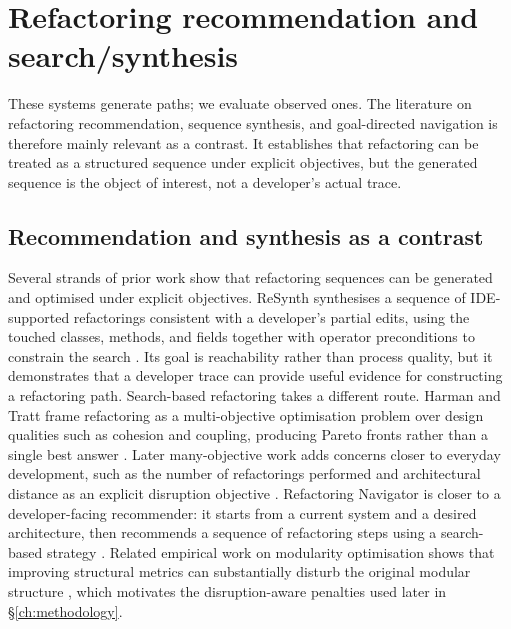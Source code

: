 \section{Refactoring recommendation and search/synthesis}
\label{sec:recommendation-synthesis}

These systems generate paths; we evaluate observed ones. The literature on refactoring recommendation, sequence synthesis, and goal-directed navigation is therefore mainly relevant as a contrast. It establishes that refactoring can be treated as a structured sequence under explicit objectives, but the generated sequence is the object of interest, not a developer's actual trace.

\subsection{Recommendation and synthesis as a contrast}
\label{sec:recommendation-contrast}

Several strands of prior work show that refactoring sequences can be generated and optimised under explicit objectives. ReSynth synthesises a sequence of IDE-supported refactorings consistent with a developer's partial edits, using the touched classes, methods, and fields together with operator preconditions to constrain the search \cite{raychev2013resynth}. Its goal is reachability rather than process quality, but it demonstrates that a developer trace can provide useful evidence for constructing a refactoring path. Search-based refactoring takes a different route. Harman and Tratt frame refactoring as a multi-objective optimisation problem over design qualities such as cohesion and coupling, producing Pareto fronts rather than a single best answer \cite{harman2007pareto}. Later many-objective work adds concerns closer to everyday development, such as the number of refactorings performed \cite{mohan2019manyobjective} and architectural distance as an explicit disruption objective \cite{cortellessa2023manyobjective}. Refactoring Navigator is closer to a developer-facing recommender: it starts from a current system and a desired architecture, then recommends a sequence of refactoring steps using a search-based strategy \cite{lin2016navigator}. Related empirical work on modularity optimisation shows that improving structural metrics can substantially disturb the original modular structure \cite{paixao2017balancing}, which motivates the disruption-aware penalties used later in \S\ref{ch:methodology}.

